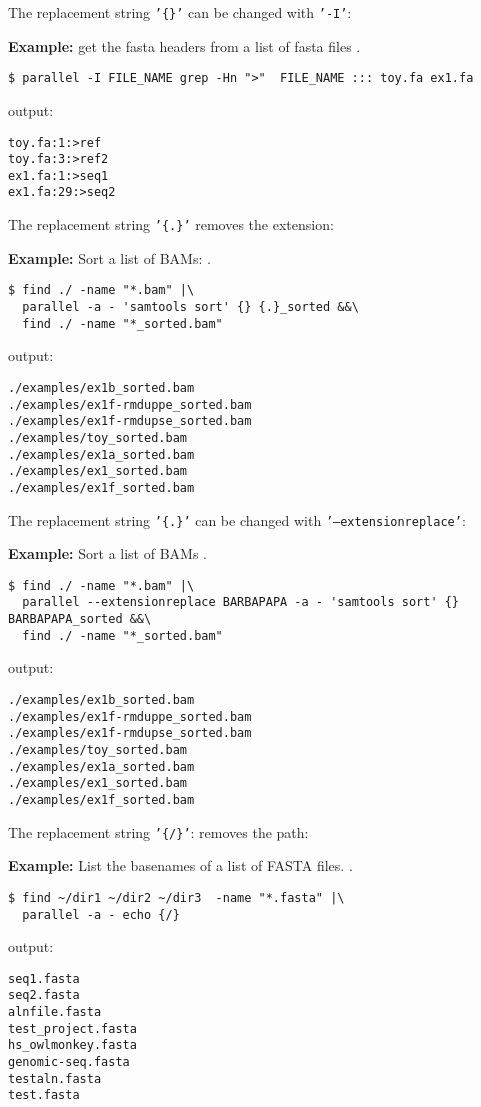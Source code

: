 \documentclass{article}
\newcommand{\example}[1]{
\textbf{Example: } {\color[rgb]{0,0,1} #1 } .
}
\newcommand{\cmdoption}[1]{\texttt{'#1'}}
\begin{document}
The replacement string \cmdoption{\{\}} can be changed with \cmdoption{-I}:
\example{get the fasta headers from a list of fasta files}
\begin{lstlisting}
$ parallel -I FILE_NAME grep -Hn ">"  FILE_NAME ::: toy.fa ex1.fa
\end{lstlisting}
output:
\begin{lstlisting}
toy.fa:1:>ref
toy.fa:3:>ref2
ex1.fa:1:>seq1
ex1.fa:29:>seq2
\end{lstlisting}

The replacement string  \texttt{'\{.\}'} removes the extension:
\example{Sort a list of BAMs:}
\begin{lstlisting}
$ find ./ -name "*.bam" |\
  parallel -a - 'samtools sort' {} {.}_sorted &&\
  find ./ -name "*_sorted.bam"
\end{lstlisting}
output:
\begin{lstlisting}
./examples/ex1b_sorted.bam
./examples/ex1f-rmduppe_sorted.bam
./examples/ex1f-rmdupse_sorted.bam
./examples/toy_sorted.bam
./examples/ex1a_sorted.bam
./examples/ex1_sorted.bam
./examples/ex1f_sorted.bam
\end{lstlisting}

The replacement string \texttt{'\{.\}'} can be changed with  \texttt{'--extensionreplace'}:
\example{Sort a list of BAMs}
\begin{lstlisting}
$ find ./ -name "*.bam" |\
  parallel --extensionreplace BARBAPAPA -a - 'samtools sort' {} BARBAPAPA_sorted &&\
  find ./ -name "*_sorted.bam"
\end{lstlisting}
output:
\begin{lstlisting}
./examples/ex1b_sorted.bam
./examples/ex1f-rmduppe_sorted.bam
./examples/ex1f-rmdupse_sorted.bam
./examples/toy_sorted.bam
./examples/ex1a_sorted.bam
./examples/ex1_sorted.bam
./examples/ex1f_sorted.bam
\end{lstlisting}



The replacement string \texttt{'\{/\}'}: removes the path:
\example{List the basenames of a list of FASTA files.}
\begin{lstlisting}
$ find ~/dir1 ~/dir2 ~/dir3  -name "*.fasta" |\
  parallel -a - echo {/}
\end{lstlisting}
output:
\begin{lstlisting}
seq1.fasta
seq2.fasta
alnfile.fasta
test_project.fasta
hs_owlmonkey.fasta
genomic-seq.fasta
testaln.fasta
test.fasta
\end{lstlisting}
\end{document}
